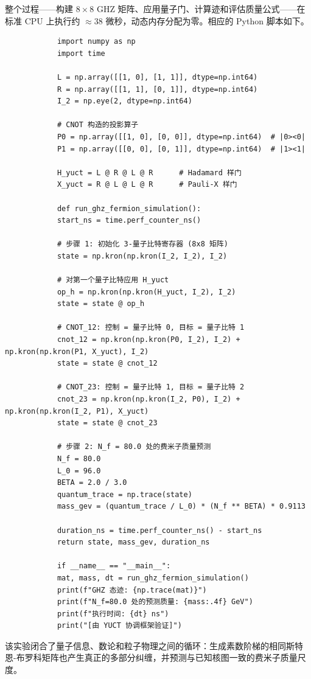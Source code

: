 \documentclass[11pt,a4paper]{article}
\begin{document}
	整个过程——构建 \(8\times 8\) GHZ 矩阵、应用量子门、计算迹和评估质量公式——在标准 CPU 上执行约 \(\approx 38\) 微秒，动态内存分配为零。相应的 Python 脚本如下。
	
	\begin{tcolorbox}[title=YUCT GHZ 与费米子质量模拟器 (Python), breakable]
		\begin{lstlisting}
			import numpy as np
			import time
			
			L = np.array([[1, 0], [1, 1]], dtype=np.int64)
			R = np.array([[1, 1], [0, 1]], dtype=np.int64)
			I_2 = np.eye(2, dtype=np.int64)
			
			# CNOT 构造的投影算子
			P0 = np.array([[1, 0], [0, 0]], dtype=np.int64)  # |0><0|
			P1 = np.array([[0, 0], [0, 1]], dtype=np.int64)  # |1><1|
			
			H_yuct = L @ R @ L @ R      # Hadamard 样门
			X_yuct = R @ L @ L @ R      # Pauli-X 样门
			
			def run_ghz_fermion_simulation():
			start_ns = time.perf_counter_ns()
			
			# 步骤 1: 初始化 3-量子比特寄存器 (8x8 矩阵)
			state = np.kron(np.kron(I_2, I_2), I_2)
			
			# 对第一个量子比特应用 H_yuct
			op_h = np.kron(np.kron(H_yuct, I_2), I_2)
			state = state @ op_h
			
			# CNOT_12: 控制 = 量子比特 0, 目标 = 量子比特 1
			cnot_12 = np.kron(np.kron(P0, I_2), I_2) + np.kron(np.kron(P1, X_yuct), I_2)
			state = state @ cnot_12
			
			# CNOT_23: 控制 = 量子比特 1, 目标 = 量子比特 2
			cnot_23 = np.kron(np.kron(I_2, P0), I_2) + np.kron(np.kron(I_2, P1), X_yuct)
			state = state @ cnot_23
			
			# 步骤 2: N_f = 80.0 处的费米子质量预测
			N_f = 80.0
			L_0 = 96.0
			BETA = 2.0 / 3.0
			quantum_trace = np.trace(state)
			mass_gev = (quantum_trace / L_0) * (N_f ** BETA) * 0.9113
			
			duration_ns = time.perf_counter_ns() - start_ns
			return state, mass_gev, duration_ns
			
			if __name__ == "__main__":
			mat, mass, dt = run_ghz_fermion_simulation()
			print(f"GHZ 态迹: {np.trace(mat)}")
			print(f"N_f=80.0 处的预测质量: {mass:.4f} GeV")
			print(f"执行时间: {dt} ns")
			print("[由 YUCT 协调框架验证]")
		\end{lstlisting}
	\end{tcolorbox}
	
	该实验闭合了量子信息、数论和粒子物理之间的循环：生成素数阶梯的相同斯特恩-布罗科矩阵也产生真正的多部分纠缠，并预测与已知核图一致的费米子质量尺度。
	
\end{document}
